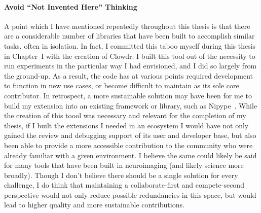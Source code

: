 \paragraph*{Avoid ``Not Invented Here'' Thinking}
A point which I have mentioned repeatedly throughout this thesis is that there are a considerable number of
libraries that have been built to accomplish similar tasks, often in isolation. In fact, I committed this taboo
myself during this thesis in Chapter~I with the creation of Clowdr. I built this tool out of the necessity to run
experiments in the particular way I had envisioned, and I did so largely from the ground-up. As a result, the code
has at various points required development to function in new use cases, or become difficult to maintain as its sole
core contributor. In retrospect, a more sustainable solution may have been for me to build my extension into an
existing framework or library, such as Nipype~\cite{gorgolewski2011nipype}. While the creation of this toool was
necessary and relevant for the completion of my thesis, if I built the extensions I needed in an ecosystem I would
have not only gained the review and debugging support of its user and developer base, but also been able to provide a
more accessible contribution to the community who were already familiar with a given environment. I believe the same
could likely be said for many tools that have been built in neuroimaging (and likely science more broadly). Though I
don't believe there should be a single solution for every challenge, I do think that maintaining a collaborate-first
and compete-second perspective would not only reduce possible redundancies in this space, but would lead to higher
quality and more sustainable contributions.
